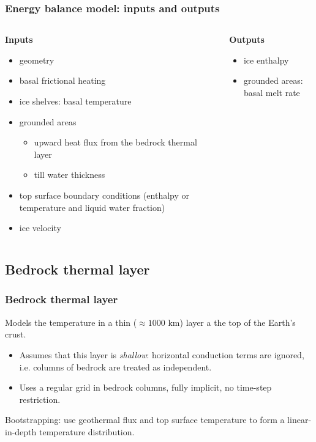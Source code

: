 \documentclass[hide notes,intlimits]{beamer}
\begin{document}
\begin{frame}
  \frametitle{Energy balance model: inputs and outputs}

  \begin{columns}[t]
    \begin{column}{0.5\linewidth}
      \textbf{Inputs}

      \begin{itemize}
      \item geometry
      \item basal frictional heating
      \item ice shelves: basal temperature
      \item grounded areas
        \begin{itemize}
        \item upward heat flux from the bedrock thermal layer
        \item till water thickness
        \end{itemize}
      \item top surface boundary conditions (enthalpy or temperature and
        liquid water fraction)
      \item ice velocity
      \end{itemize}
    \end{column}
    \begin{column}{0.5\linewidth}
      \textbf{Outputs}

      \begin{itemize}
      \item ice enthalpy
      \item grounded areas: basal melt rate
      \end{itemize}
    \end{column}
  \end{columns}

\end{frame}

\subsection{Bedrock thermal layer}
\label{sec:bedrock}

\begin{frame}
  \frametitle{Bedrock thermal layer}
  Models the temperature in a thin ($\approx 1000$ km) layer a the top
  of the Earth's crust.

  \begin{itemize}
  \item Assumes that this layer is \emph{shallow}: horizontal
    conduction terms are ignored, i.e. columns of bedrock are treated
    as independent.
  \item Uses a regular grid in bedrock columns, fully implicit, no
    time-step restriction.
  \end{itemize}

  Bootstrapping: use geothermal flux and top surface temperature to
  form a linear-in-depth temperature distribution.
\end{frame}
\end{document}
